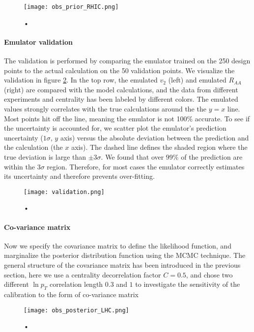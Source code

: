 \begin{figure}
\centering
\texttt{[image: obs\_prior\_RHIC.png]}
\caption{•}
\label{fig:new:obs_prior_RHIC}
\end{figure}

\paragraph{Emulator validation} 
The validation is performed by comparing the emulator trained on the 250 design points to the actual calculation on the 50 validation points.
We visualize the validation in figure \ref{fig:new:validation}.
In the top row, the emulated $v_2$ (left) and emulated $R_{AA}$ (right) are compared with the model calculations, and the data from different experiments and centrality has been labeled by different colors.
The emulated values strongly correlates with the true calculations around the the $y=x$ line.
Most points hit off the line, meaning the emulator is not 100\% accurate.
To see if the uncertainty is accounted for, we scatter plot the emulator's prediction uncertainty ($1\sigma$, $y$ axis) versus the absolute deviation between the prediction and the calculation (the $x$ axis).
The dashed line defines the shaded region where the true deviation is large than $\pm 3\sigma$.
We found that over $99\%$ of the prediction are within the $3\sigma$ region.
Therefore, for most cases the emulator correctly estimates its uncertainty  and therefore prevents over-fitting.

\begin{figure}
\centering
\texttt{[image: validation.png]}
\caption{•}
\label{fig:new:validation}
\end{figure}

\paragraph{Co-variance matrix} Now we specify the covariance matrix to define the likelihood function, and marginalize the posterior distribution function using the MCMC technique.
The general structure of the covariance matrix has been introduced in the previous section, here we use a centrality decorrelation factor $C=0.5$, and chose two different $\ln p_T$ correlation length $0.3$ and $1$ to investigate the sensitivity of the calibration to the form of co-variance matrix

\begin{figure}
\centering
\texttt{[image: obs\_posterior\_LHC.png]}
\caption{•}
\label{fig:new:obs_posterior_LHC}
\end{figure}

